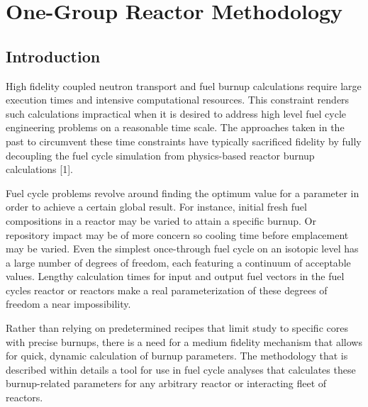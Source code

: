 \chapter{One-Group Reactor Methodology}
\label{1g_paper}



\section{Introduction}
\label{1g_sec:intro}
High fidelity coupled neutron transport and fuel burnup calculations require large execution times
and intensive computational resources.  This constraint renders such calculations impractical when 
it is desired to address high level fuel cycle engineering problems on a reasonable time scale.  
The approaches taken in the past to circumvent these time constraints have typically sacrificed 
fidelity by fully decoupling the fuel cycle simulation from physics-based reactor burnup calculations [1].  

Fuel cycle problems revolve around finding the optimum value for a parameter in order to achieve a certain 
global result.  For instance, initial fresh fuel compositions in a reactor may be varied to attain a specific 
burnup. Or repository impact may be of more concern so cooling time before emplacement may be varied.  Even 
the simplest once-through fuel cycle on an isotopic level has a large number of degrees of freedom, each 
featuring a continuum of acceptable values.  Lengthy calculation times for input and output fuel vectors 
in the fuel cycles reactor or reactors make a real parameterization of these degrees of freedom a near 
impossibility.  

Rather than relying on predetermined recipes that limit study to specific cores with precise burnups, 
there is a need for a medium fidelity mechanism that allows for quick, dynamic calculation of burnup 
parameters.  The methodology that is described within details a tool for use in fuel cycle analyses 
that calculates these burnup-related parameters for any arbitrary reactor or interacting fleet of reactors.

